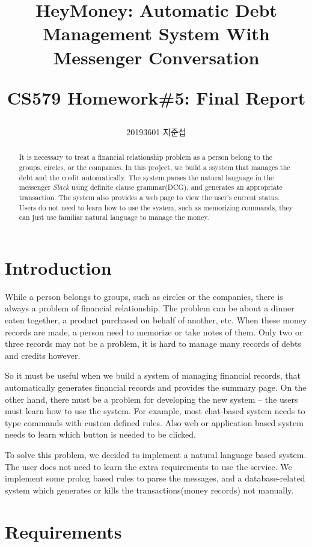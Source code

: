 \documentclass[11pt]{article}
\author{20193601 지준섭}
\title{HeyMoney: Automatic Debt Management System With Messenger Conversation \\
\begin{large}
  CS579 Homework\#5: Final Report
\end{large}}
\begin{document}
\maketitle

\begin{abstract}
  It is necessary to treat a financial relationship problem as a person
  belong to the groups, circles, or the companies.
  In this project, we build a ssystem that manages the debt and the credit automatically.
  The system parses the natural language in the messenger \textit{Slack}
  using definite clause grammar(DCG), and generates an appropriate transaction.
  The system also provides a web page to view the user's current status.
  Users do not need to learn how to use the system, such as memorizing commands,
  they can just use familiar natural language to manage the money.
\end{abstract}


\section{Introduction}

While a person belongs to groups, such as circles or the companies,
there is always a problem of financial relationship.
The problem can be about a dinner eaten together,
a product purchased on behalf of another, etc.
When these money records are made, a person need to memorize or take notes of them.
Only two or three records may not be a problem,
it is hard to manage many records of debts and credits however.

So it must be useful when we build a system of managing financial records,
that automatically generates financial records and provides the summary page.
On the other hand, there must be a problem for developing the new system --
the users must learn how to use the system.
For example, most chat-based system needs to type commands with custom defined
rules. Also web or application based system needs to learn
which button is needed to be clicked.

To solve this problem, we decided to implement a natural language based system.
The user does not need to learn the extra requirements to use the service.
We implement some prolog based rules to parse the messages,
and a database-related system which generates or kills the
transactions(money records) not manually.

\section{Requirements}
\end{document}
